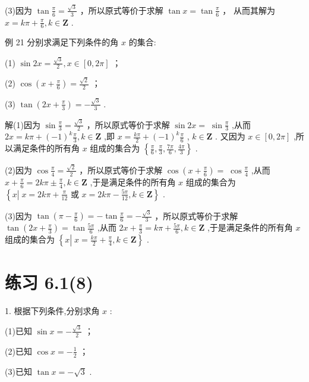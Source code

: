 \documentclass[10pt]{article}
\begin{document}
(3)因为 \(\tan \frac{\pi }{6} = \frac{\sqrt{3}}{3}\) ，所以原式等价于求解 \(\tan x = \tan \frac{\pi }{6}\) ， 从而其解为 \(x = {k\pi } + \frac{\pi }{6},k \in  \mathbf{Z}\) .

例 21 分别求满足下列条件的角 \(x\) 的集合:

(1) \(\sin {2x} = \frac{\sqrt{3}}{2},x \in  \left\lbrack  {0,{2\pi }}\right\rbrack\) ；

(2) \(\cos \left( {x + \frac{\pi }{6}}\right)  = \frac{\sqrt{2}}{2}\) ；

(3) \(\tan \left( {{2x} + \frac{\pi }{3}}\right)  =  - \frac{\sqrt{3}}{3}\) .

解(1)因为 \(\sin \frac{\pi }{3} = \frac{\sqrt{3}}{2}\) ，所以原式等价于求解 \(\sin {2x} = \; \sin \frac{\pi }{3}\) ,从而 \({2x} = {k\pi } + {\left( -1\right) }^{k}\frac{\pi }{3},k \in  \mathbf{Z}\) ,即 \(x = \frac{k\pi }{2} + {\left( -1\right) }^{k}\frac{\pi }{6}\) , \(k \in  \mathbf{Z}\) . 又因为 \(x \in  \left\lbrack  {0,{2\pi }}\right\rbrack\) ,所以满足条件的所有角 \(x\) 组成的集合为 \(\left\{  {\frac{\pi }{6},\frac{\pi }{3},\frac{7\pi }{6},\frac{4\pi }{3}}\right\}\) .

(2)因为 \(\cos \frac{\pi }{4} = \frac{\sqrt{2}}{2}\) ，所以原式等价于求解 \(\cos \left( {x + \frac{\pi }{6}}\right)  = \; \cos \frac{\pi }{4}\) ,从而 \(x + \frac{\pi }{6} = {2k\pi } \pm  \frac{\pi }{4},k \in  \mathbf{Z}\) ,于是满足条件的所有角 \(x\) 组成的集合为 \(\left\{  {x\left| {\;x = {2k\pi } + \frac{\pi }{12}}\right. \text{ 或 }x = {2k\pi } - \frac{5\pi }{12},k \in  \mathbf{Z}}\right\}\) .

(3)因为 \(\tan \left( {\pi  - \frac{\pi }{6}}\right)  =  - \tan \frac{\pi }{6} =  - \frac{\sqrt{3}}{3}\) ，所以原式等价于求解 \(\tan \left( {{2x} + \frac{\pi }{3}}\right)  = \tan \frac{5\pi }{6}\) ,从而 \({2x} + \frac{\pi }{3} = {k\pi } + \frac{5\pi }{6},k \in  \mathbf{Z}\) ,于是满足条件的所有角 \(x\) 组成的集合为 \(\left\{  {x\left| {\;x = \frac{k\pi }{2} + \frac{\pi }{4}}\right. ,k \in  \mathbf{Z}}\right\}\) .

\section*{练习 6.1(8)}

1. 根据下列条件,分别求角 \(x\) :

(1)已知 \(\sin x =  - \frac{\sqrt{3}}{2}\) ；

(2)已知 \(\cos x =  - \frac{1}{2}\) ；

(3)已知 \(\tan x =  - \sqrt{3}\) .
\end{document}

